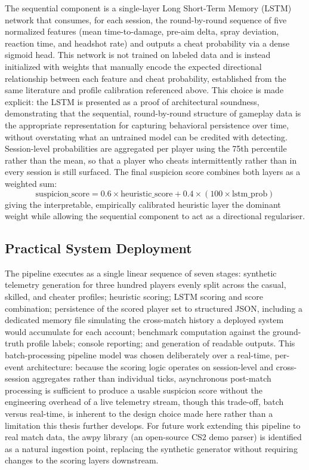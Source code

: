 The sequential component is a single-layer Long Short-Term Memory (LSTM) network that consumes, for each session, the round-by-round sequence of five normalized features (mean time-to-damage, pre-aim delta, spray deviation, reaction time, and headshot rate) and outputs a cheat probability via a dense sigmoid head. This network is not trained on labeled data and is instead initialized with weights that manually encode the expected directional relationship between each feature and cheat probability, established from the same literature and profile calibration referenced above. This choice is made explicit: the LSTM is presented as a proof of architectural soundness, demonstrating that the sequential, round-by-round structure of gameplay data is the appropriate representation for capturing behavioral persistence over time, without overstating what an untrained model can be credited with detecting. Session-level probabilities are aggregated per player using the 75th percentile rather than the mean, so that a player who cheats intermittently rather than in every session is still surfaced. The final suspicion score combines both layers as a weighted sum:
\begin{equation}
    \text{suspicion\_score} = 0.6 \times \text{heuristic\_score} + 0.4 \times \left(100 \times \text{lstm\_prob}\right)
    \label{eq:suspicion_score}
\end{equation}
giving the interpretable, empirically calibrated heuristic layer the dominant weight while allowing the sequential component to act as a directional regulariser.

\subsection{Practical System Deployment}
\label{sec:three:one:three}

The pipeline executes as a single linear sequence of seven stages: synthetic telemetry generation for three hundred players evenly split across the casual, skilled, and cheater profiles; heuristic scoring; LSTM scoring and score combination; persistence of the scored player set to structured JSON, including a dedicated memory file simulating the cross-match history a deployed system would accumulate for each account; benchmark computation against the ground-truth profile labels; console reporting; and generation of readable outputs. This batch-processing pipeline model was chosen deliberately over a real-time, per-event architecture: because the scoring logic operates on session-level and cross-session aggregates rather than individual ticks, asynchronous post-match processing is sufficient to produce a usable suspicion score without the engineering overhead of a live telemetry stream, though this trade-off, batch versus real-time, is inherent to the design choice made here rather than a limitation this thesis further develops. For future work extending this pipeline to real match data, the awpy library (an open-source CS2 demo parser) is identified as a natural ingestion point, replacing the synthetic generator without requiring changes to the scoring layers downstream.

